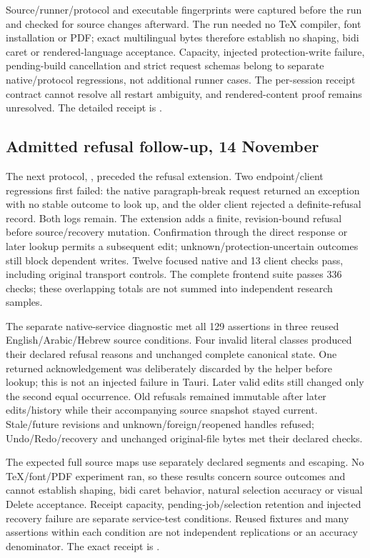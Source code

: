 Source/runner/protocol and executable fingerprints were captured before the
run and checked for source changes afterward. The run needed no TeX compiler,
font installation or PDF; exact multilingual bytes therefore establish no
shaping, bidi caret or rendered-language acceptance. Capacity, injected
protection-write failure, pending-build cancellation and strict request schemas
belong to separate native/protocol regressions, not additional runner cases.
The per-session receipt contract cannot resolve all restart ambiguity, and
rendered-content proof remains unresolved. The detailed receipt is
.

\subsection{Admitted refusal follow-up, 14 November}
The next protocol, , preceded the
refusal extension. Two endpoint/client regressions first failed: the native
paragraph-break request returned an exception with no stable outcome to look
up, and the older client rejected a definite-refusal record. Both logs remain.
The extension adds a finite, revision-bound refusal before source/recovery
mutation. Confirmation through the direct response or later lookup permits a
subsequent edit; unknown/protection-uncertain outcomes still block dependent
writes. Twelve focused native and 13 client checks pass, including original
transport controls. The complete frontend suite passes 336 checks; these
overlapping totals are not summed into independent research samples.

The separate native-service diagnostic met all 129 assertions in three reused
English/Arabic/Hebrew source conditions. Four invalid literal classes produced
their declared refusal reasons and unchanged complete canonical state. One
returned acknowledgement was deliberately discarded by the helper before
lookup; this is not an injected failure in Tauri. Later valid edits still
changed only the second equal occurrence. Old refusals remained immutable
after later edits/history while their accompanying source snapshot stayed
current. Stale/future revisions and unknown/foreign/reopened handles refused;
Undo/Redo/recovery and unchanged original-file bytes met their declared checks.

The expected full source maps use separately declared segments and escaping.
No TeX/font/PDF experiment ran, so these results concern source outcomes and
cannot establish shaping, bidi caret behavior, natural selection accuracy or
visual Delete acceptance. Receipt capacity, pending-job/selection retention
and injected recovery failure are separate service-test conditions. Reused
fixtures and many assertions within each condition are not independent
replications or an accuracy denominator. The exact receipt is
.

